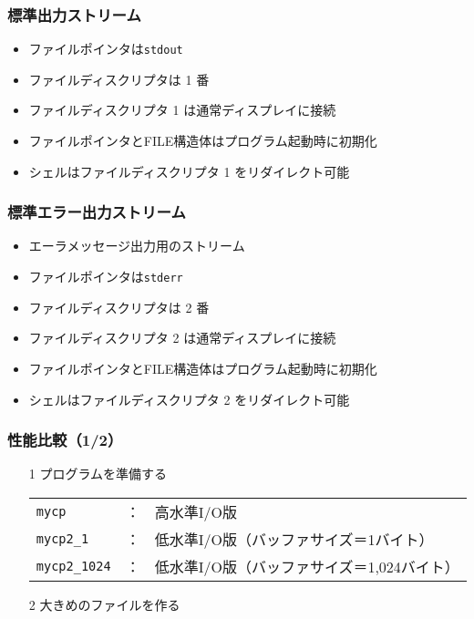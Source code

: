 \documentclass{beamer}                 %
\begin{document}
\begin{frame}
  \frametitle{標準出力ストリーム}
  \begin{itemize}
  \item ファイルポインタは\texttt{stdout}
  \item ファイルディスクリプタは 1 番
  \item ファイルディスクリプタ 1 は通常ディスプレイに接続
  \item ファイルポインタとFILE構造体はプログラム起動時に初期化
  \item シェルはファイルディスクリプタ 1 をリダイレクト可能
  \end{itemize}
\end{frame}

\begin{frame}
  \frametitle{標準エラー出力ストリーム}
  \begin{itemize}
  \item エーラメッセージ出力用のストリーム
  \item ファイルポインタは\texttt{stderr}
  \item ファイルディスクリプタは 2 番
  \item ファイルディスクリプタ 2 は通常ディスプレイに接続
  \item ファイルポインタとFILE構造体はプログラム起動時に初期化
  \item シェルはファイルディスクリプタ 2 をリダイレクト可能
  \end{itemize}
\end{frame}

\begin{frame}
  \frametitle{性能比較（1/2）}
  \begin{enumerate}
  \item[1] プログラムを準備する \\
    \begin{tabular}{l l l}
    \texttt{mycp}        & ： &  高水準I/O版 \\
    \texttt{mycp2\_1}    & ： &  低水準I/O版（バッファサイズ＝1バイト）\\
    \texttt{mycp2\_1024} & ： &  低水準I/O版（バッファサイズ＝1,024バイト）\\
    \end{tabular}
  \item[2] 大きめのファイルを作る \\
  \end{enumerate}
\end{frame}
\end{document}
